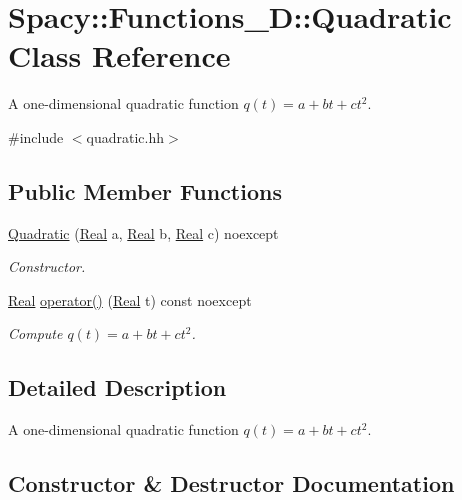 \hypertarget{classSpacy_1_1Functions__1D_1_1Quadratic}{}\section{Spacy\+:\+:Functions\+\_\+D\+:\+:Quadratic Class Reference}
\label{classSpacy_1_1Functions__1D_1_1Quadratic}


A one-\/dimensional quadratic function $q(t) = a + bt + ct^2$.  




{\ttfamily \#include $<$quadratic.\+hh$>$}

\subsection*{Public Member Functions}
\begin{DoxyCompactItemize}
\item 
\hyperlink{classSpacy_1_1Functions__1D_1_1Quadratic_a3dda95ccea43bb2d1c0d3d0662bf5a7e_a3dda95ccea43bb2d1c0d3d0662bf5a7e}{Quadratic} (\hyperlink{classSpacy_1_1Real}{Real} a, \hyperlink{classSpacy_1_1Real}{Real} b, \hyperlink{classSpacy_1_1Real}{Real} c) noexcept
\begin{DoxyCompactList}\small\item\em Constructor. \end{DoxyCompactList}\item 
\hyperlink{classSpacy_1_1Real}{Real} \hyperlink{classSpacy_1_1Functions__1D_1_1Quadratic_adc2d2a19028f32177120477aa6a5ffe2_adc2d2a19028f32177120477aa6a5ffe2}{operator()} (\hyperlink{classSpacy_1_1Real}{Real} t) const noexcept
\begin{DoxyCompactList}\small\item\em Compute $q(t) = a + bt + ct^2 $. \end{DoxyCompactList}\end{DoxyCompactItemize}


\subsection{Detailed Description}
A one-\/dimensional quadratic function $q(t) = a + bt + ct^2$. 

\subsection{Constructor \& Destructor Documentation}
\hypertarget{classSpacy_1_1Functions__1D_1_1Quadratic_a3dda95ccea43bb2d1c0d3d0662bf5a7e_a3dda95ccea43bb2d1c0d3d0662bf5a7e}{}
